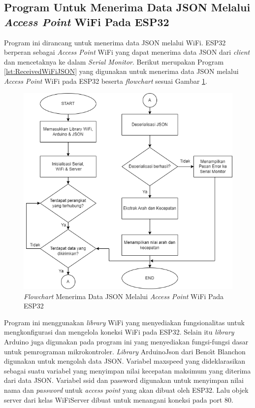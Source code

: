 \subsection{Program Untuk Menerima Data JSON Melalui \emph{Access Point} WiFi Pada ESP32}

Program ini dirancang untuk menerima data JSON melalui WiFi. ESP32 berperan sebagai \emph{Access Point} WiFi yang dapat menerima data JSON dari \emph{client} dan mencetaknya ke dalam \emph{Serial Monitor}. Berikut merupakan Program \ref{lst:ReceivedWiFiJSON} yang digunakan untuk menerima data JSON melalui \emph{Access Point} WiFi pada ESP32 beserta \emph{flowchart} sesuai Gambar \ref{fig:Flowchart 5 JSON}.

\begin{figure} [ht] \centering
  \includegraphics[scale=0.7]{gambar/program/5. JSON WiFi.png}
  \caption{\emph{Flowchart} Menerima Data JSON Melalui \emph{Access Point} WiFi Pada ESP32}
  \label{fig:Flowchart 5 JSON}
\end{figure}

Program ini menggunakan \emph{library} WiFi yang menyediakan fungsionalitas untuk mengkonfigurasi dan mengelola koneksi WiFi pada ESP32. Selain itu \emph{library} Arduino juga digunakan pada program ini yang menyediakan fungsi-fungsi dasar untuk pemrograman mikrokontroler. \emph{Library} ArduinoJson dari Beno\^{\i}t Blanchon digunakan untuk mengolah data JSON. Variabel maxspeed yang dideklarasikan sebagai suatu variabel yang menyimpan nilai kecepatan maksimum yang diterima dari data JSON. Variabel ssid dan password digunakan untuk menyimpan nilai nama dan \emph{password} untuk \emph{access point} yang akan dibuat oleh ESP32. Lalu objek server dari kelas WiFiServer dibuat untuk menangani koneksi pada port 80.

